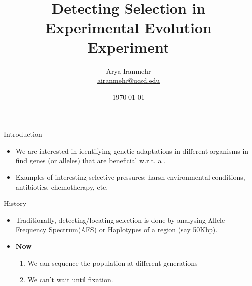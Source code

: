 \documentclass[t]{beamer} %
\title{Detecting Selection in Experimental Evolution Experiment}
\subtitle{}
\author[Arya Iranmehr]
{%
  \texorpdfstring{
      \centering
      Arya Iranmehr\\
      \href{mailto:airanmehr@ucsd.edu}{airanmehr@ucsd.edu}
  }
  {Arya Iranmehr}
}
\institute{
Bafna Lab\\
University of California, San Diego}
\date{
\monthyeardate\today}
\begin{document}
\begin{frame}
  \titlepage
\end{frame}


\begin{frame}{Introduction}
\begin{itemize}
\item We are interested in identifying genetic adaptations in different organisms in find genes (or alleles) that are beneficial w.r.t. a  .
\item Examples of interesting selective pressures: harsh environmental conditions, antibiotics, chemotherapy, etc.
\end{itemize}
\end{frame}



\begin{frame}{History}
\begin{itemize}
\item Traditionally, detecting/locating selection is done by analysing Allele 
Frequency Spectrum(AFS) or Haplotypes of a region (say 50Kbp).
\item {\bf Now}
\begin{enumerate}
\item We can sequence the population at different generations
\item We can't wait until fixation. 
\end{enumerate}
\end{itemize}
\end{frame}
\end{document}
